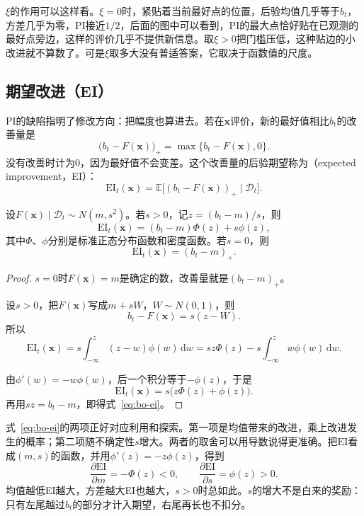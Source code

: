 $\xi$的作用可以这样看。$\xi=0$时，紧贴着当前最好点的位置，后验均值几乎等于$b_t$，方差几乎为零，PI接近$1/2$，后面的图中可以看到，PI的最大点恰好贴在已观测的最好点旁边，这样的评价几乎不提供新信息。取$\xi>0$把门槛压低，这种贴边的小改进就不算数了。可是$\xi$取多大没有普适答案，它取决于函数值的尺度。

\subsection{期望改进（EI）}
\label{sec:bo-ei}

PI的缺陷指明了修改方向：把幅度也算进去。若在$\bm{x}$评价，新的最好值相比$b_t$的改善量是
\[
 \bigl(b_t-F(\bm{x})\bigr)_+=\max\{b_t-F(\bm{x}),0\}.
\]
没有改善时计为$0$，因为最好值不会变差。这个改善量的后验期望称为（expected improvement，EI）：
\begin{equation}
 \mathrm{EI}_t(\bm{x})=\mathbb{E}\bigl[(b_t-F(\bm{x}))_+\mid\mathcal{D}_t\bigr].
 \label{eq:bo-ei-def}
\end{equation}

\begin{theorem}[期望改进的闭式]
\label{thm:bo-ei}
设$F(\bm{x})\mid\mathcal{D}_t\sim N(m,s^2)$。若$s>0$，记$z=(b_t-m)/s$，则
\begin{equation}
 \mathrm{EI}_t(\bm{x})=(b_t-m)\Phi(z)+s\phi(z),
 \label{eq:bo-ei}
\end{equation}
其中$\Phi$、$\phi$分别是标准正态分布函数和密度函数。若$s=0$，则
\begin{equation}
 \mathrm{EI}_t(\bm{x})=(b_t-m)_+.
 \label{eq:bo-ei-zero}
\end{equation}
\end{theorem}

\begin{proof}
$s=0$时$F(\bm{x})=m$是确定的数，改善量就是$(b_t-m)_+$。

设$s>0$，把$F(\bm{x})$写成$m+sW$，$W\sim N(0,1)$，则
\[
 b_t-F(\bm{x})=s(z-W).
\]
所以
\[
 \mathrm{EI}_t(\bm{x})=s\int_{-\infty}^{z}(z-w)\phi(w)\,\mathrm{d}w
 =sz\Phi(z)-s\int_{-\infty}^{z}w\phi(w)\,\mathrm{d}w.
\]

由$\phi'(w)=-w\phi(w)$，后一个积分等于$-\phi(z)$，于是
\[
 \mathrm{EI}_t(\bm{x})=s\bigl(z\Phi(z)+\phi(z)\bigr).
\]
再用$sz=b_t-m$，即得式~\eqref{eq:bo-ei}。
\end{proof}

式~\eqref{eq:bo-ei}的两项正好对应利用和探索。第一项是均值带来的改进，乘上改进发生的概率；第二项随不确定性$s$增大。两者的取舍可以用导数说得更准确。把$\mathrm{EI}$看成$(m,s)$的函数，并用$\phi'(z)=-z\phi(z)$，得到
\begin{equation}
 \frac{\partial\mathrm{EI}}{\partial m}=-\Phi(z)<0,\qquad
 \frac{\partial\mathrm{EI}}{\partial s}=\phi(z)>0.
 \label{eq:bo-ei-derivatives}
\end{equation}
均值越低EI越大，方差越大EI也越大，$s>0$时总如此。$s$的增大不是白来的奖励：只有左尾越过$b_t$的部分才计入期望，右尾再长也不扣分。

